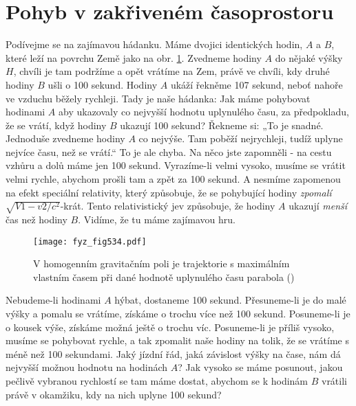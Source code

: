   \section{Pohyb v zakřiveném časoprostoru}\label{fyz:IIchapXVLIIsecVIII}
    Podívejme se na zajímavou hádanku. Máme dvojici identických hodin, \(A\) a \(B\), které leží na 
    povrchu Země jako na obr. \ref{fyz:fig534}. Zvedneme hodiny \(A\) do nějaké výšky \(H\), chvíli 
    je tam podržíme a opět vrátíme na Zem, právě ve chvíli, kdy druhé hodiny \(B\) ušli o \num{100} 
    sekund. Hodiny \(A\) ukáží řekněme \num{107} sekund, neboť nahoře ve vzduchu běžely rychleji. 
    Tady je naše hádanka: Jak máme pohybovat hodinami \(A\) aby ukazovaly co nejvyšší hodnotu 
    uplynulého času, za předpokladu, že se vrátí, když hodiny \(B\) ukazují \num{100} sekund? 
    Řekneme si: „To je snadné. Jednoduše zvedneme hodiny \(A\) co nejvýše. Tam poběží nejrychleji, 
    tudíž uplyne nejvíce času, než se vrátí.“ To je ale chyba. Na něco jste zapomněli - na cestu 
    vzhůru a dolů máme jen \num{100} sekund. Vyrazíme-li velmi vysoko, musíme se vrátit velmi 
    rychle, abychom prošli tam a zpět za \num{100} sekund. A nesmíme zapomenou na efekt speciální 
    relativity, který způsobuje, že se pohybující hodiny \emph{zpomalí} \(\sqrt{V1 - 
    v2/c^2}\)-krát. Tento relativistický jev způsobuje, že hodiny \(A\) ukazují \emph{menší} čas 
    než hodiny \(B\). Vidíme, že tu máme zajímavou hru.
    
    \begin{figure}[ht!] %
      \centering
      \texttt{[image: fyz\_fig534.pdf]}
      \caption{V homogenním gravitačním poli je trajektorie s maximálním vlastním časem při dané 
               hodnotě uplynulého času parabola
               (\cite[s.~791]{Feynman02})}
      \label{fyz:fig534}
    \end{figure}
    
    Nebudeme-li hodinami \(A\) hýbat, dostaneme \num{100} sekund. Přesuneme-li je do malé výšky a 
    pomalu se vrátíme, získáme o trochu více než \num{100} sekund. Posuneme-li je o kousek výše, 
    získáme možná ještě o trochu víc. Posuneme-li je příliš vysoko, musíme se pohybovat rychle, a 
    tak zpomalit naše hodiny na tolik, že se vrátíme s méně než \num{100} sekundami. Jaký jízdní 
    řád, jaká závislost výšky na čase, nám dá nejvyšší možnou hodnotu na hodinách \(A\)? Jak vysoko 
    se máme posunout, jakou pečlivě vybranou rychlostí se tam máme dostat, abychom se k hodinám 
    \(B\) vrátili právě v okamžiku, kdy na nich uplyne \num{100} sekund?
    
